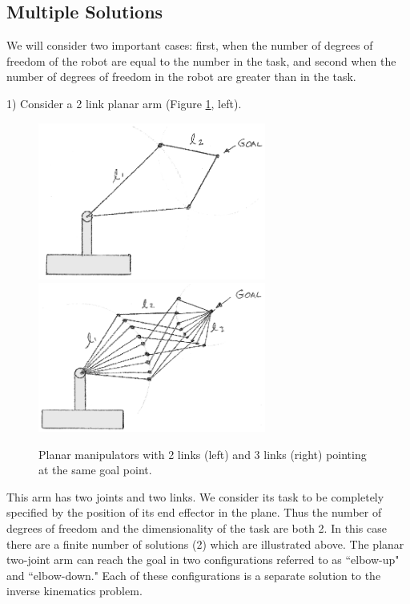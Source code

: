 \subsection{Multiple Solutions}

We will consider two important cases: first, when the number of degrees of freedom of the robot are equal to the number in the task, and second when the number of degrees of freedom in the robot are greater than in the task.

1) Consider a 2 link planar arm (Figure \ref{2link3link}, left).

\begin{figure}\centering
\includegraphics[width=75mm]{figs04/00716.eps} \hspace{0.1in}
\includegraphics[width=75mm]{figs04/00717.eps}
\caption{Planar manipulators with 2 links (left) and 3 links (right) pointing at the same goal point.}\label{2link3link}
\end{figure}


This arm has two joints and two links.   We consider its task to be completely specified by the position of its end effector in the plane.  Thus the number of degrees of freedom and the dimensionality of the task are both 2.
In this case there are a finite number of solutions (2) which are illustrated above.   The planar two-joint arm can reach the goal in two configurations referred to as ``elbow-up" and ``elbow-down."  Each of these configurations is a separate solution to the inverse kinematics problem.

